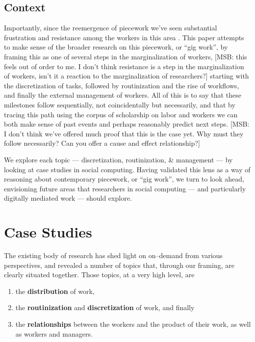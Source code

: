 \documentclass{sigchi}
\newcommand{\msb}[1]{{\color{PineGreen}[MSB: #1]}}
\begin{document}
\subsection{Context}
Importantly, since the reemergence of piecework we've seen substantial frustration
and resistance among the workers in this area
\cite{uberAlgorithm,turkopticon,dynamo}.
This paper attempts to make sense of the broader research on this piecework,
or ``gig work'', by framing this as one of several steps in the marginalization of workers, \msb{this feels out of order to me. I don't think resistance is a step in the marginalization of workers, isn't it a reaction to the marginalization of researchers?}
starting with the discretization of tasks,
followed by routinization and the rise of workflows,
and finally the external management of workers.
All of this is to say that these milestones follow sequentially,
not coincidentally but necessarily,
and that by tracing this path using the corpus of scholarship on labor and workers
we can both make sense of past events and perhaps reasonably predict next steps. \msb{I don't think we've offered much proof that this is the case yet. Why must they follow necessarily? Can you offer a cause and effect relationship?}

We explore each topic
--- discretization, routinization, \& management ---
by looking at case studies in social computing.
Having validated this lens as a way of reasoning about contemporary piecework, or ``gig work'',
we turn to look ahead, envisioning future areas that researchers in social computing
--- and particularly digitally mediated work ---
should explore.

\section{Case Studies}
The existing body of research has shed light on on--demand from various perspectives,
and revealed a number of topics that,
through our framing, are clearly situated together.
Those topics, at a very high level, are
\begin{enumerate}
\item the \textbf{distribution} of work,
\item the \textbf{routinization} and \textbf{discretization} of work, and finally
\item the \textbf{relationships} between the workers and the product of their work,
      as well as workers and managers.
\end{enumerate}
\end{document}

